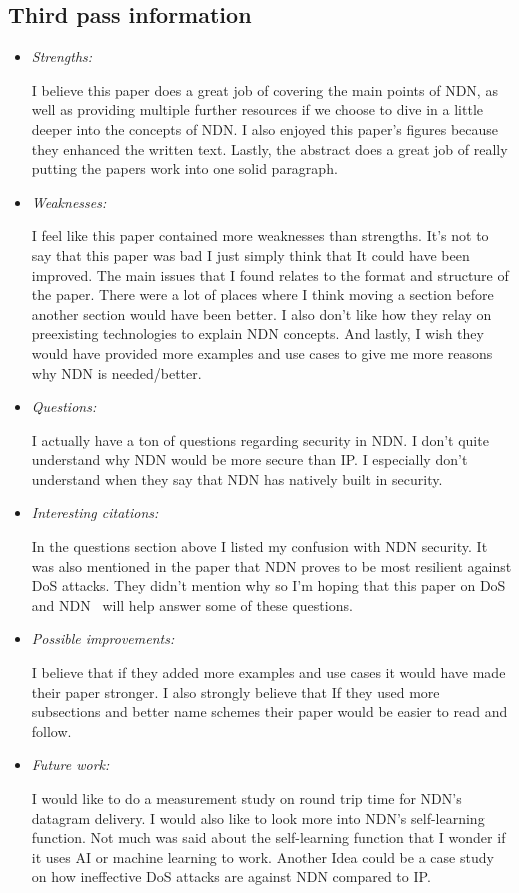 \documentclass[letterpaper,twocolumn,10pt]{article}
\begin{document}
\subsection{Third pass information}
\label{sec:third}
\begin{itemize}

\item {\it Strengths:} 

I believe this paper does a great job of covering the main points of NDN, as well as providing multiple further 
resources if we choose to dive in a little deeper into the concepts of NDN. I also enjoyed this paper's figures
because they enhanced the written text. Lastly, the abstract does a great job of really putting the papers work
into one solid paragraph.

\item {\it Weaknesses:} 

I feel like this paper contained more weaknesses than strengths. It's not to say that this paper was bad I just
simply think that It could have been improved. The main issues that I found relates to the format and structure
of the paper. There were a lot of places where I think moving a section before another section would have been
better. I also don't like how they relay on preexisting technologies to explain NDN concepts. And lastly, I wish
they would have provided more examples and use cases to give me more reasons why NDN is needed/better. 

\item {\it Questions:} 

I actually have a ton of questions regarding security in NDN. I don't quite understand why NDN would be 
more secure than IP. I especially don't understand when they say that NDN has natively built in security. 

\item {\it Interesting citations:} 

In the questions section above I listed my confusion with NDN security. It was also mentioned in the paper
that NDN proves to be most resilient against DoS attacks. They didn't mention why so I'm hoping that 
this paper on DoS and NDN~\cite{ndndos} will help answer some of these questions. 

\item {\it Possible improvements:} 

I believe that if they added more examples and use cases it would have made their paper stronger.  I also 
strongly believe that If they used more subsections and better name schemes their paper would be easier
to read and follow.

\item {\it Future work:} 

I would like to do a measurement study on round trip time for NDN's datagram delivery. I would also like 
to look more into NDN's self-learning function. Not much was said about the self-learning function that I 
wonder if it uses AI or machine learning to work. Another Idea could be a case study on how ineffective 
DoS attacks are against NDN compared to IP. 

\end{itemize}

{
  \small 
  
  
}
\end{document}
